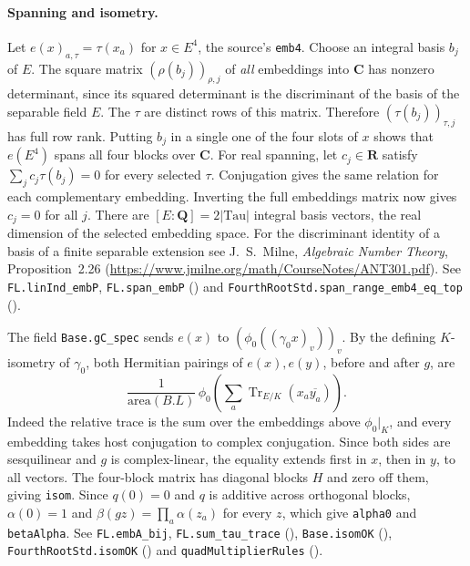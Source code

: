 \paragraph{Spanning and isometry.}\label{r16:std-isom}
Let $e(x)_{a,\tau}=\tau(x_a)$ for $x\in E^4$, the source's
\nolinkurl{emb4}. Choose an integral basis $b_j$ of $E$. The square
matrix $(\rho(b_j))_{\rho,j}$ of \emph{all} embeddings into $\mathbf C$
has nonzero determinant, since its squared determinant is the
discriminant of the basis of the separable field $E$. The $\tau$ are
distinct rows of this matrix. Therefore $(\tau(b_j))_{\tau,j}$ has full
row rank. Putting $b_j$ in a single one of the four slots of $x$
shows that $e(E^4)$ spans all four blocks over $\mathbf C$. For real spanning, let $c_j\in\mathbf R$ satisfy
$\sum_j c_j\tau(b_j)=0$ for every selected $\tau$. Conjugation gives
the same relation for each complementary embedding. Inverting the
full embeddings matrix now gives $c_j=0$ for all $j$.
There are $[E:\mathbf Q]=2|\mathrm{Tau}|$ integral basis vectors,
the real dimension of the selected embedding space. For the discriminant
identity of a basis of a finite separable extension see J.~S.~Milne,
\emph{Algebraic Number Theory}, Proposition~2.26
(\url{https://www.jmilne.org/math/CourseNotes/ANT301.pdf}).
See \nolinkurl{FL.linInd_embP}, \nolinkurl{FL.span_embP}
() and
\nolinkurl{FourthRootStd.span_range_emb4_eq_top}
().

The field \nolinkurl{Base.gC_spec} sends $e(x)$ to
$(\phi_0((\gamma_0x)_v))_v$. By the defining $K$-isometry of $\gamma_0$,
both Hermitian pairings of $e(x),e(y)$, before and after $g$, are
\[
 \frac{1}{\mathrm{area}(B.L)}\,
 \phi_0\!\left(\sum_a\operatorname{Tr}_{E/K}(x_a\overline{y_a})\right).
\]
Indeed the relative trace is the sum over the embeddings above
$\phi_0|_K$, and every embedding takes host conjugation to complex
conjugation. Since both sides are sesquilinear and $g$ is complex-linear,
the equality extends first in $x$, then in $y$, to all vectors.
The four-block matrix has diagonal blocks $H$ and zero off them, giving
\nolinkurl{isom}. Since $q(0)=0$ and $q$ is additive across orthogonal
blocks, $\alpha(0)=1$ and $\beta(gz)=\prod_a\alpha(z_a)$ for every
$z$, which give \nolinkurl{alpha0} and \nolinkurl{betaAlpha}.
See \nolinkurl{FL.embA_bij}, \nolinkurl{FL.sum_tau_trace}
(),
\nolinkurl{Base.isomOK}
(),
\nolinkurl{FourthRootStd.isomOK} ()
and \nolinkurl{quadMultiplierRules}
().

